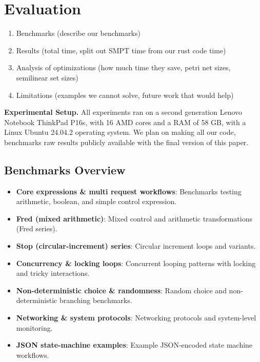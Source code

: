 \section{Evaluation}
\label{sec:evaluation}

\begin{enumerate}
    \item Benchmarks (describe our benchmarks)
    \item Results (total time, split out SMPT time from our rust code time)
    \item Analysis of optimizations (how much time they save, petri net sizes, semilinear set sizes)
    \item Limitations (examples we cannot solve, future work that would help)
\end{enumerate}


\noindent
\textbf{Experimental Setup.}
All experiments ran on a second generation Lenovo Notebook ThinkPad P16s, with 16 AMD cores and a RAM of 58 GB, with a Linux Ubuntu 24.04.2 operating system.
%
We plan on making all our code, benchmarks raw results publicly available with the final version of this paper.
 


\subsection{Benchmarks Overview}
\label{subsec:benchmarks}

\begin{itemize}
	\item \textbf{Core expressions \& multi request workflows}: Benchmarks testing arithmetic, boolean, and simple control expression.
	\item \textbf{Fred (mixed arithmetic)}: Mixed control and arithmetic transformations (Fred series).
	\item \textbf{Stop (circular-increment) series}: Circular increment loops and variants.
	\item \textbf{Concurrency \& locking loops}: Concurrent looping patterns with locking and tricky interactions.
	\item \textbf{Non-deterministic choice \& randomness}: Random choice and non-deterministic branching benchmarks.
	\item \textbf{Networking \& system protocols}: Networking protocols and system-level monitoring.
	\item \textbf{JSON state-machine examples}: Example JSON-encoded state machine workflows.
\end{itemize}



